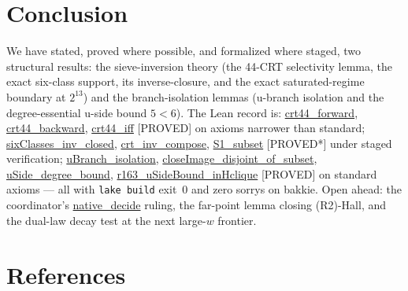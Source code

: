 \documentclass[11pt,a4paper]{article}
\theoremstyle{definition}
\begin{document}
\section{Conclusion}

We have stated, proved where possible, and formalized where staged, two
structural results: the sieve-inversion theory (the 44-CRT selectivity
lemma, the exact six-class support, its inverse-closure, and the exact
saturated-regime boundary at $2^{13}$) and the branch-isolation lemmas
(u-branch isolation and the degree-essential u-side bound $5<6$).
The Lean record is: \url{crt44_forward},
\url{crt44_backward}, \url{crt44_iff} [PROVED] on axioms
narrower than standard; \url{sixClasses_inv_closed},
\url{crt_inv_compose}, \url{S1_subset} [PROVED*] under
staged verification; \url{uBranch_isolation},
\url{closeImage_disjoint_of_subset},
\url{uSide_degree_bound},
\url{r163_uSideBound_inHclique} [PROVED] on standard axioms ---
all with \texttt{lake build} exit~0 and zero sorrys on bakkie.
Open ahead: the coordinator's \url{native_decide} ruling, the
far-point lemma closing (R2)-Hall, and the dual-law decay test at the
next large-$w$ frontier.

\section{References}
\end{document}
